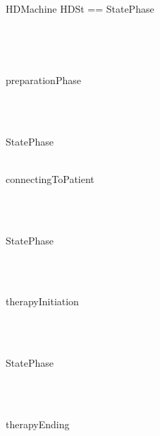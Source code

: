 \begin{circus}
\circprocess HDMachine \circdef \circbegin 
\circstate HDSt == 
StatePhase \circdef \\
	\begin{block}
		\\
			\begin{block}
				\\
					\begin{block}
						preparationPhase \then \\
							\begin{block}
								\\
								\begin{block}
									
								\end{block}\\
								 \circseq StatePhase
							\end{block}\\
							 \extchoice connectingToPatient \then \\
							\begin{block}
								\\
								\begin{block}
									
								\end{block}\\
								 \circseq StatePhase
							\end{block}\\
							
					\end{block}\\
					 \extchoice therapyInitiation \then \\
					\begin{block}
						\\
						\begin{block}
							
						\end{block}\\
						 \circseq StatePhase
					\end{block}\\
					
			\end{block}\\
			 \extchoice therapyEnding \then \\
			\begin{block}
				\\
				\begin{block}
					

\end{block}
\end{block}
\end{block}
\end{circus}
